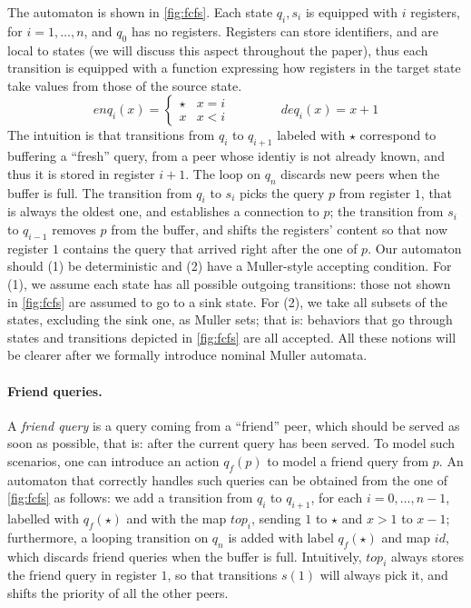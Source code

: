 %
The automaton is shown in \autoref{fig:fcfs}. Each state $q_i,s_i$ is equipped with $i$ registers, for $i=1,\dots,n$, and $q_0$ has no registers. Registers can store identifiers, and are local to states (we will discuss this aspect throughout the paper), thus each transition is equipped with a function expressing how registers in the target state take values from those of the source state.
\[
	enq_i(x) = 
	\begin{cases}
		\star & x = i \\
		x & x < i
	\end{cases}
	\qquad
	\qquad
	deq_i(x) = x + 1
\]
%
The intuition is that transitions from $q_i$ to $q_{i+1}$ labeled with $\star$ correspond to buffering a ``fresh'' query, from a peer whose identiy is not already known, and thus it is stored in register $i+1$. The loop on $q_n$ discards new peers when the buffer is full. The transition from $q_i$ to $s_i$ picks the query $p$ from register $1$, that is always the oldest one, and establishes a connection to $p$;
the transition from $s_i$ to $q_{i-1}$ removes $p$ from the buffer, and shifts the registers' content so that now register $1$ contains the query that arrived right after the one of $p$. Our automaton should (1) be deterministic and (2) have a Muller-style accepting condition. For (1), we assume each state has all possible outgoing transitions: those not shown in \autoref{fig:fcfs} are assumed to go to a sink state. For (2), we take all subsets of the states, excluding the sink one, as Muller sets; that is: behaviors that go through states and transitions depicted in \autoref{fig:fcfs} are all accepted. All these notions will be clearer after we formally introduce nominal Muller automata.

%

\paragraph{Friend queries.} A \emph{friend query} is a query coming from a ``friend'' peer, which should be served as soon as possible, that is: after the current query has been served. To model such scenarios, one can introduce an action $q_f(p)$ to model a friend query from $p$. An automaton that correctly handles such queries can be obtained from the one of \autoref{fig:fcfs} as follows: we add a transition from $q_i$ to $q_{i+1}$, for each $i=0,\dots,n-1$, labelled with $q_f(\star)$ and with the map $top_i$, sending $1$ to $\star$ and $x > 1$ to $x-1$; furthermore, a looping transition on $q_n$ is added with label $q_f(\star)$ and map $id$, which discards friend queries when the buffer is full. Intuitively, $top_i$ always stores the friend query in register $1$, so that transitions $s(1)$ will always pick it, and shifts the priority of all the other peers.

